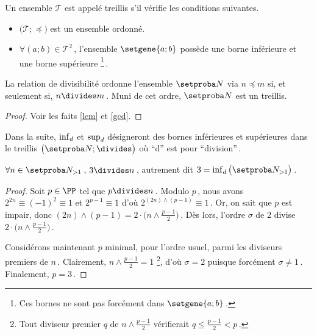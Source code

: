 Un ensemble $\mathcal{T}$ est appelé treillis s'il vérifie les conditions suivantes.
%
\begin{itemize}
	\item $\big( \mathcal{T} ; \preccurlyeq \big)$ est un ensemble ordonné.

	\item $\forall (a ; b) \in \mathcal{T}^2$\,, l'ensemble $\setgene{a ; b}$ possède une borne inférieure et une borne supérieure
	\footnote{
		Ces bornes ne sont pas forcément dans $\setgene{a ; b}$\,.
	}\,. 
\end{itemize}




\begin{fact}
	La relation de divisibilité ordonne l'ensemble $\ourset$ via $n  \preccurlyeq m$ si, et seulement si, $n \divides m$\,.
	Muni de cet ordre, $\ourset$ est un treillis.
\end{fact}

\begin{proof}
	Voir les faits \ref{lcm} et \ref{gcd}.
\end{proof}


Dans la suite, $\inf_d$ et $\sup_d$ désigneront des bornes inférieures et supérieures dans le treillis $\big( \ourset ; \divides \big)$ où \enquote{d} est pour \enquote{division}\,.




\begin{fact}
	$\forall n \in \ourset_{>1}$\,, $3 \divides n$\,, autrement dit $3 = \dinf \big( \ourset_{>1} \big)$\,.
\end{fact}

\begin{proof}
	Soit $p \in \PP$ tel que $p \divides n$\,.
	Modulo $p$\,, nous avons
	$2^{2n} \equiv (- 1)^2 \equiv 1$
	et
	$2^{p-1} \equiv 1$
	d'où
	$2^{(2n) \wedge (p-1)} \equiv 1$\,.
	Or, on sait que $p$ est impair, donc $(2n) \wedge (p-1) = 2 \cdot \big( n \wedge \frac{p-1}{2} \big)$\,.
	Dès lors, l'ordre $\sigma$ de $2$ divise $2 \cdot \big( n \wedge \frac{p-1}{2} \big)$\,.
	
	\medskip
	
	Considérons maintenant $p$ minimal, pour l'ordre usuel, parmi les diviseurs premiers de $n$\,.
	Clairement, $n \wedge \frac{p-1}{2} = 1$
	\footnote{
		Tout diviseur premier $q$ de $n \wedge \frac{p-1}{2}$ vérifierait $q \leq \frac{p-1}{2} < p$\,.
	},
	d'où $\sigma = 2$ puisque forcément $\sigma \neq 1$\,.
	Finalement, $p = 3$\,.
\end{proof}


